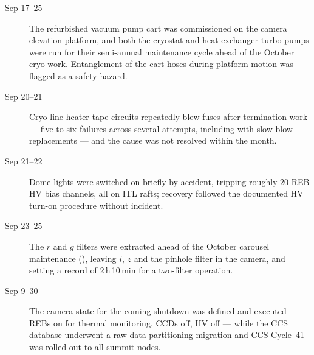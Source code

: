\begin{description}
\item[Sep 17--25] The refurbished vacuum pump cart was commissioned on
  the camera elevation platform, and both the cryostat and heat-exchanger
  turbo pumps were run for their semi-annual maintenance cycle ahead
  of the October cryo work.  Entanglement of the cart hoses during
  platform motion was flagged as a safety hazard.

\item[Sep 20--21] Cryo-line heater-tape circuits repeatedly blew
  fuses after termination work --- five to six failures across several
  attempts, including with slow-blow replacements --- and the cause
  was not resolved within the month.

\item[Sep 21--22] Dome lights were switched on briefly by accident,
  tripping roughly 20 REB HV bias channels, all on ITL rafts;
  recovery followed the documented HV turn-on procedure without
  incident.

\item[Sep 23--25] The $r$ and $g$ filters were extracted ahead of the
  October carousel maintenance (), leaving $i$, $z$ and
  the pinhole filter in the camera, and setting a record of
  2\,h\,10\,min for a two-filter operation.

\item[Sep 9--30] The camera state for the coming shutdown was defined
  and executed --- REBs on for thermal monitoring, CCDs off, HV off
  --- while the CCS database underwent a raw-data partitioning
  migration and CCS Cycle~41 was rolled out to all summit nodes.
\end{description}

